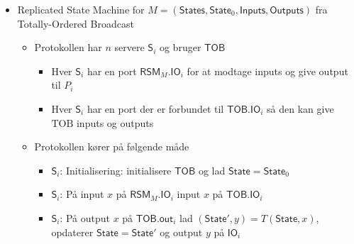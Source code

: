 \documentclass[a4, english]{article}
\begin{document}
\begin{itemize}
\begin{itemize}
\begin{itemize}
    \end{itemize}
  \end{itemize}
  \item Replicated State Machine for $M = (\mathsf{States}, \mathsf{State}_0 , \mathsf{Inputs}, \mathsf{Outputs})$ fra Totally-Ordered Broadcast
  \begin{itemize}
  	\item Protokollen har $n$ servere $\mathsf {S}_i$ og bruger $\mathsf{TOB}$ 
    \begin{itemize}
    	\item Hver $\mathsf{S}_i$ har en port $\mathsf{RSM}_M.\mathsf{IO}_i$ for at modtage inputs og give output til $P_i$  
      \item Hver $\mathsf{S}_i$ har en port der er forbundet til $\mathsf{TOB}.\mathsf{IO}_i$ så den kan give $\text{TOB}$ inputs og outputs
    \end{itemize}
    \item Protokollen kører på følgende måde
    \begin{itemize}
    	\item $\mathsf{S}_i$: Initialisering: initialisere $\mathsf{TOB}$ og lad $\mathsf{State} = \mathsf{State}_0$ 
    	\item $\mathsf{S}_i$: På input $x$ på $\mathsf{RSM}_M.\mathsf{IO}_i$ input $x$ på $\mathsf{TOB}.\mathsf{IO}_i$
    	\item $\mathsf{S}_i$: På output $x$ på $\mathsf{TOB}.\mathsf{out}_i$ lad $(\mathsf{State}', y) = T(\mathsf{State}, x)$, opdaterer $\mathsf{State} = \mathsf{State}'$ og output $y$ på $\mathsf{IO}_i$ 
    \end{itemize}
  \end{itemize}
\end{itemize}
\end{document}
